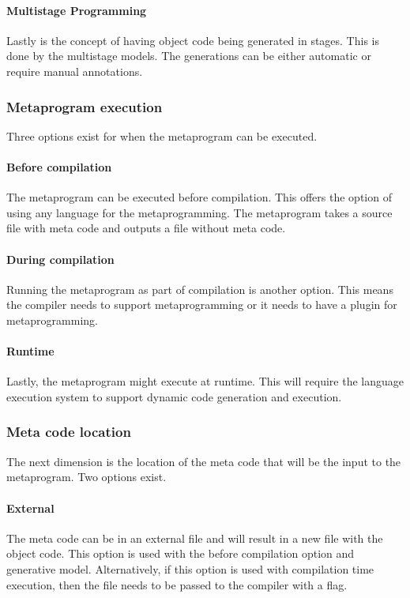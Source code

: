 \paragraph{Multistage Programming}
Lastly is the concept of having object code being generated in stages.
This is done by the multistage models.
The generations can be either automatic or require manual annotations. \cite{sheard_01_01, taha_04_01}

\subsubsection{Metaprogram execution}
Three options exist for when the metaprogram can be executed.

\paragraph{Before compilation}
The metaprogram can be executed before compilation.
This offers the option of using any language for the metaprogramming.
The metaprogram takes a source file with meta code and outputs a file without meta code. \cite{savidis_19_01}

\paragraph{During compilation}
Running the metaprogram as part of compilation is another option.
This means the compiler needs to support metaprogramming or it needs to have a plugin for metaprogramming. \cite{savidis_19_01}

\paragraph{Runtime}
Lastly, the metaprogram might execute at runtime.
This will require the language execution system to support dynamic code generation and execution. \cite{savidis_19_01}

\subsubsection{Meta code location}
The next dimension is the location of the meta code that will be the input to the metaprogram.
Two options exist.

\paragraph{External}
The meta code can be in an external file and will result in a new file with the object code.
This option is used with the before compilation option and generative model.
Alternatively, if this option is used with compilation time execution, then the file needs to be passed to the compiler with a flag. \cite{savidis_19_01}


